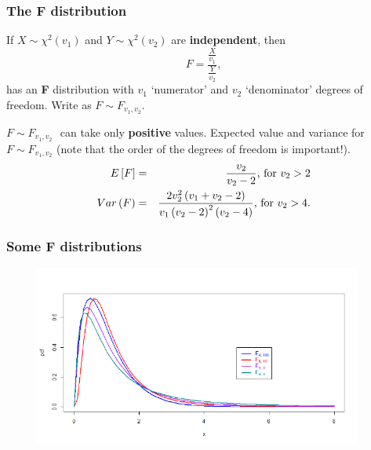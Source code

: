 \documentclass[notes=show,smaller,handout]{beamer}
\begin{document}
\begin{frame}%

\frametitle{The F distribution}

\begin{definition}
If $X\sim \chi ^{2}(v_{1})$ and $Y\sim \chi ^{2}(v_{2})$ are \textbf{%
independent}, then%
\begin{equation*}
F=\frac{\frac{X}{v_{1}}}{\frac{Y}{v_{2}}},
\end{equation*}%
has an \textbf{F} distribution with $v_{1}$ `numerator' and $v_{2}$
`denominator' degrees of freedom. Write as $F\sim F_{v_{1},v_{2}}$.
\end{definition}

$F\sim F_{v_{1},v_{2}}\,$\ can take only \textbf{positive }values. Expected value and variance for $F\sim F_{v_{1},v_{2}}$ (note that the order of the degrees of freedom is important!).
\begin{eqnarray*}
E\left[ F\right] &=&\frac{v_{2}}{v_{2}-2}\text{, for }v_{2}>2 \\
Var\left( F\right) &=&\frac{2v_{2}^{2}\left( v_{1}+v_{2}-2\right) }{%
v_{1}\left( v_{2}-2\right) ^{2}\left( v_{2}-4\right) }\text{, for }v_{2}>4.
\end{eqnarray*}

\end{frame}

\begin{frame}
\frametitle{Some F distributions}

\begin{figure}[ptb]\centering
\includegraphics[height=2.3324in, width=4.2462in]{F-dist_pds__6.pdf}%
\end{figure}%
\end{frame}%
\end{document}

